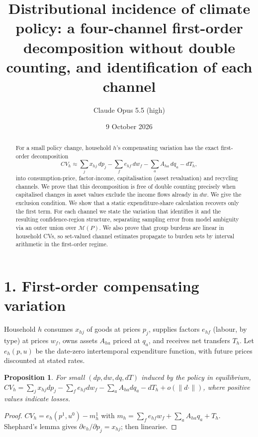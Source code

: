 \documentclass[11pt]{article}
\title{Distributional incidence of climate policy: a four-channel first-order decomposition without double counting, and identification of each channel}
\author{Claude Opus 5.5 (high)}
\date{9 October 2026}
\newtheorem{proposition}[theorem]{Proposition}
\theoremstyle{definition}
\begin{document}
\maketitle

\begin{abstract}
For a small policy change, household $h$'s compensating variation has the exact first-order decomposition
\[
 CV_h\approx\sum_jx_{hj}\,dp_j-\sum_fe_{hf}\,dw_f-\sum_aA_{ha}\,dq_a-dT_h,
\]
into consumption-price, factor-income, capitalisation (asset revaluation) and recycling channels. We prove that this
decomposition is free of double counting precisely when capitalised changes in asset values exclude the income flows already in
$dw$. We give the exclusion condition. We show that a static expenditure-share calculation recovers only the first term. For
each channel we state the variation that identifies it and the resulting confidence-region structure, separating sampling
error from model ambiguity via an outer union over $\mathcal M(P)$. We also prove that group burdens are linear in household
CVs, so set-valued channel estimates propagate to burden sets by interval arithmetic in the first-order regime.
\end{abstract}

\section*{1. First-order compensating variation}
Household $h$ consumes $x_{hj}$ of goods at prices $p_j$, supplies factors $e_{hf}$ (labour, by type) at prices $w_f$, owns
assets $A_{ha}$ priced at $q_a$, and receives net transfers $T_h$. Let $e_h(p,u)$ be the date-zero intertemporal expenditure
function, with future prices discounted at stated rates.
\begin{proposition}\label{prop:cv}
For small $(dp,dw,dq,dT)$ induced by the policy in equilibrium,
$CV_h=\sum_jx_{hj}dp_j-\sum_fe_{hf}dw_f-\sum_aA_{ha}dq_a-dT_h+o(\|d\cdot\|)$, where positive values indicate losses.
\end{proposition}
\begin{proof}
$CV_h=e_h(p^1,u^0)-m_h^1$ with $m_h=\sum_fe_{hf}w_f+\sum_aA_{ha}q_a+T_h$. Shephard's lemma gives $\partial e_h/\partial p_j=x_{hj}$;
then linearise.
\end{proof}
\end{document}
